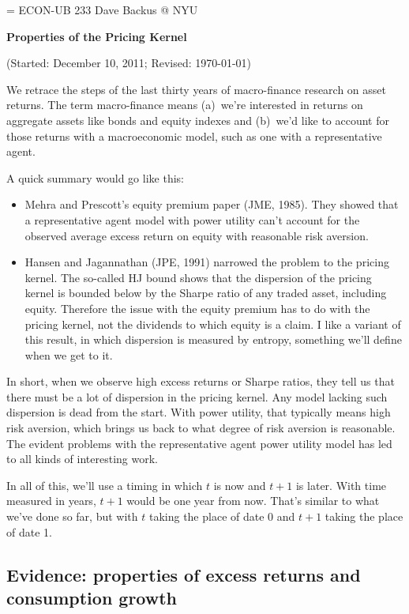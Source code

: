 \documentclass[11pt]{article}
\begin{document}
\parskip=\bigskipamount
\parindent=0.0in
\thispagestyle{empty}
{\large ECON-UB 233 \hfill Dave Backus @ NYU}

\bigskip\bigskip
\centerline{\Large \bf Properties of the Pricing Kernel}
\centerline{(Started: December 10, 2011; Revised: \today)}

\bigskip
We retrace the steps of the last thirty years of macro-finance research on asset returns.
The term macro-finance means
(a)~we're interested in returns on aggregate assets like bonds and equity indexes
and (b)~we'd like to account for those returns with a macroeconomic model,
such as one with a representative agent.

A quick summary would go like this:
%
\begin{itemize}
\item Mehra and Prescott's equity premium paper (JME, 1985).
They showed that a representative agent model with power utility
can't account for the observed average excess return on equity
with reasonable risk aversion.
\item Hansen and Jagannathan (JPE, 1991) narrowed the problem to the pricing kernel.
The so-called HJ bound shows that the dispersion of the pricing kernel
is bounded below by the Sharpe ratio of any traded asset, including equity.
Therefore the issue with the equity premium has to do with the pricing kernel,
not the dividends to which equity is a claim.
I like a variant of this result, in which dispersion is measured
by entropy, something we'll define when we get to it.
\end{itemize}
%
In short, when we observe high excess returns or Sharpe ratios,
they tell us that there must be a lot of dispersion in the pricing kernel.
Any model lacking such dispersion is dead from the start.
With power utility, that typically means high risk aversion,
which brings us back to what degree of risk aversion is reasonable.
The evident problems with the representative agent power utility model
has led to all kinds of interesting work.

In all of this, we'll use a timing in which $t$ is now
and $t+1$ is later.
With time measured in years, $t+1$ would be one year from now.
That's similar to what we've done so far,
but with $t$ taking the place of date 0 and $t+1$ taking the place of date 1.


\subsection*{Evidence:  properties of excess returns and consumption growth}
\end{document}
